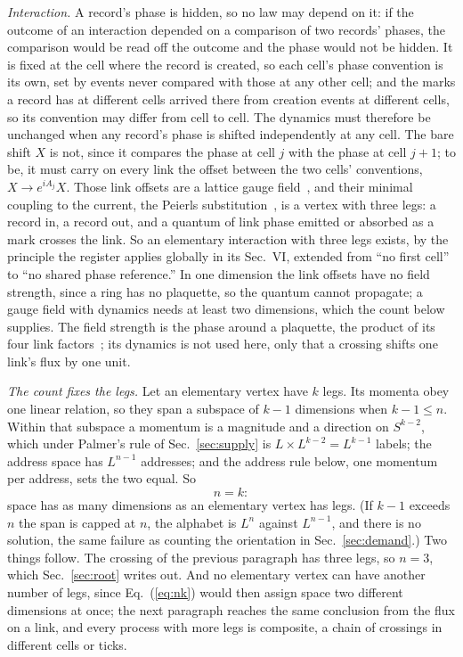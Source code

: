 \documentclass[aps,prd,twocolumn,superscriptaddress,nofootinbib]{revtex4-2}
\begin{document}
\textit{Interaction.} A record's phase is hidden, so no law may depend on it: if the outcome of an interaction depended on a comparison of two records' phases, the comparison would be read off the outcome and the phase would not be hidden. It is fixed at the cell where the record is created, so each cell's phase convention is its own, set by events never compared with those at any other cell; and the marks a record has at different cells arrived there from creation events at different cells, so its convention may differ from cell to cell. The dynamics must therefore be unchanged when any record's phase is shifted independently at any cell. The bare shift $X$ is not, since it compares the phase at cell $j$ with the phase at cell $j+1$; to be, it must carry on every link the offset between the two cells' conventions, $X \to e^{iA_j}X$. Those link offsets are a lattice gauge field~\cite{wilson1974}, and their minimal coupling to the current, the Peierls substitution~\cite{peierls1933}, is a vertex with three legs: a record in, a record out, and a quantum of link phase emitted or absorbed as a mark crosses the link. So an elementary interaction with three legs exists, by the principle the register applies globally in its Sec.~VI, extended from ``no first cell'' to ``no shared phase reference.'' In one dimension the link offsets have no field strength, since a ring has no plaquette, so the quantum cannot propagate; a gauge field with dynamics needs at least two dimensions, which the count below supplies. The field strength is the phase around a plaquette, the product of its four link factors~\cite{wilson1974}; its dynamics is not used here, only that a crossing shifts one link's flux by one unit.

\textit{The count fixes the legs.} Let an elementary vertex have $k$ legs. Its momenta obey one linear relation, so they span a subspace of $k-1$ dimensions when $k-1 \le n$. Within that subspace a momentum is a magnitude and a direction on $S^{k-2}$, which under Palmer's rule of Sec.~\ref{sec:supply} is $L\times L^{k-2} = L^{k-1}$ labels; the address space has $L^{n-1}$ addresses; and the address rule below, one momentum per address, sets the two equal. So
\begin{equation}
n = k :
\label{eq:nk}
\end{equation}
space has as many dimensions as an elementary vertex has legs. (If $k-1$ exceeds $n$ the span is capped at $n$, the alphabet is $L^n$ against $L^{n-1}$, and there is no solution, the same failure as counting the orientation in Sec.~\ref{sec:demand}.) Two things follow. The crossing of the previous paragraph has three legs, so $n = 3$, which Sec.~\ref{sec:root} writes out. And no elementary vertex can have another number of legs, since Eq.~(\ref{eq:nk}) would then assign space two different dimensions at once; the next paragraph reaches the same conclusion from the flux on a link, and every process with more legs is composite, a chain of crossings in different cells or ticks.
\end{document}
